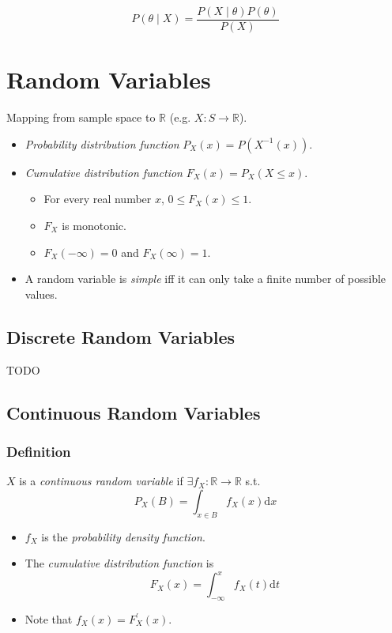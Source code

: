 \documentclass[twocolumn,english]{article}
\begin{document}
\[
P\left(\theta\mid X\right)=\frac{P\left(X\mid\theta\right)P\left(\theta\right)}{P\left(X\right)}
\]

\section{Random Variables}

Mapping from sample space to $\mathbb{R}$ (e.g. $X:S\rightarrow\mathbb{R}$).
\begin{itemize}
\item \emph{Probability distribution function} $P_{X}\left(x\right)=P\left(X^{-1}\left(x\right)\right)$.
\item \emph{Cumulative distribution function} $F_{X}\left(x\right)=P_{X}\left(X\leq x\right)$.
\begin{itemize}
\item For every real number $x$, $0\leq F_{X}\left(x\right)\leq1$.
\item $F_{X}$ is monotonic.
\item $F_{X}\left(-\infty\right)=0$ and $F_{X}\left(\infty\right)=1$.
\end{itemize}
\item A random variable is \emph{simple} iff it can only take a finite number
of possible values.
\end{itemize}

\subsection{Discrete Random Variables}

TODO

\subsection{Continuous Random Variables}

\subsubsection{Definition}

$X$ is a \emph{continuous random variable} if $\exists f_{X}:\mathbb{R}\rightarrow\mathbb{R}$
s.t.
\[
P_{X}\left(B\right)=\int_{x\in B}f_{X}\left(x\right)\text{d}x
\]
\begin{itemize}
\item $f_{X}$ is the \emph{probability density function}.
\item The \emph{cumulative distribution function} is
\[
F_{X}\left(x\right)=\int_{-\infty}^{x}f_{X}\left(t\right)\text{d}t
\]
\item Note that $f_{X}\left(x\right)=F_{X}^{\prime}\left(x\right)$.
\end{itemize}
\end{document}
